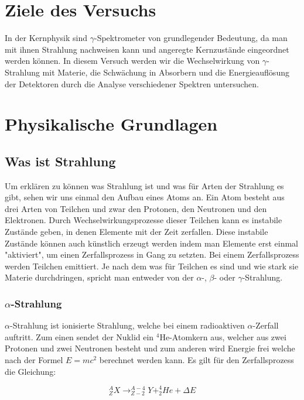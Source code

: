 \section{Ziele des Versuchs}

In der Kernphysik sind $\gamma$-Spektrometer von grundlegender Bedeutung, da man mit ihnen Strahlung nachweisen kann und angeregte Kernzustände eingeordnet werden können. In diesem Versuch werden wir die Wechselwirkung von $\gamma$-Strahlung mit Materie, die Schwächung in Absorbern und die Energieauflösung der Detektoren durch die Analyse verschiedener Spektren untersuchen.

\section{Physikalische Grundlagen}

	\subsection{Was ist Strahlung}
	Um erklären zu können was Strahlung ist und was für Arten der Strahlung es gibt, sehen wir uns einmal den Aufbau eines Atoms an. Ein Atom besteht aus drei Arten von Teilchen und zwar den Protonen, den Neutronen und den Elektronen. Durch Wechselwirkungsprozesse dieser Teilchen kann es instabile Zustände geben, in denen Elemente mit der Zeit zerfallen. Diese instabile Zustände können auch künstlich erzeugt werden indem man  Elemente erst einmal "aktiviert", um einen Zerfallsprozess in Gang zu setzten. Bei einem Zerfallsprozess werden Teilchen emittiert. Je nach dem was für Teilchen es sind und wie stark sie Materie durchdringen, spricht man entweder von der $\alpha$-, $\beta$- oder $\gamma$-Strahlung. 
\\

	\subsubsection*{$\alpha$-Strahlung}
	$\alpha$-Strahlung ist ionisierte Strahlung, welche bei einem radioaktiven $\alpha$-Zerfall auftritt. Zum einen sendet der Nuklid ein $^{4}$He-Atomkern aus, welcher aus zwei Protonen und zwei Neutronen besteht und zum anderen wird Energie frei welche nach der Formel $E=mc^{2}$ berechnet werden kann. Es gilt für den Zerfallsprozess die Gleichung:

	\begin{equation}
	^{A}_{Z}X \rightarrow ^{A-4}_{Z-2}Y + ^{4}_{2}He + \Delta E 
	\end{equation}


